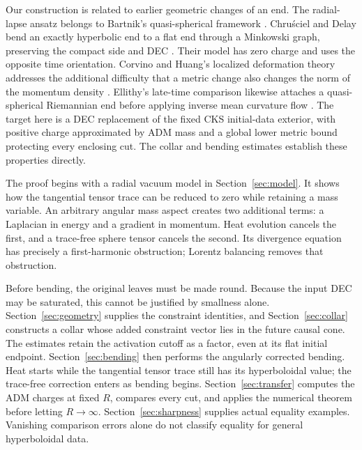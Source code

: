 Our construction is related to earlier geometric changes of an end.
The radial-lapse ansatz belongs to Bartnik's quasi-spherical framework
\cite{Bartnik}\cite[Section~5]{BartnikICM}.
Chru\'sciel and Delay bend an exactly hyperbolic end to a flat end
through a Minkowski graph, preserving the compact side and DEC
\cite[proof of Theorem~4.2]{ChruscielDelay}. Their model has zero charge
and uses the opposite time orientation. Corvino and Huang's localized
deformation theory addresses the additional difficulty that a metric
change also changes the norm of the momentum density
\cite[Introduction and Equation~(1.1)]{CorvinoHuang}.
Ellithy's late-time comparison likewise attaches a quasi-spherical
Riemannian end before applying inverse mean curvature flow
\cite[Appendix~C, proof of Theorem~C.1]{Ellithy}.
The target here is a DEC replacement of the fixed CKS initial-data
exterior, with positive charge approximated by ADM mass and a global
lower metric bound protecting every enclosing cut. The collar and
bending estimates establish these properties directly.

The proof begins with a radial vacuum model in
Section~\ref{sec:model}. It shows how the tangential tensor trace can
be reduced to zero while retaining a mass variable. An arbitrary angular
mass aspect creates two additional terms: a Laplacian in energy and a
gradient in momentum. Heat evolution cancels the first, and a trace-free
sphere tensor cancels the second. Its divergence equation has precisely
a first-harmonic obstruction; Lorentz balancing removes that obstruction.

Before bending, the original leaves must be made round. Because the
input DEC may be saturated, this cannot be justified by smallness alone.
Section~\ref{sec:geometry} supplies the constraint identities, and
Section~\ref{sec:collar} constructs a collar whose added constraint
vector lies in the future causal cone. The estimates retain the
activation cutoff as a factor, even at its flat initial endpoint.
Section~\ref{sec:bending} then performs the angularly corrected bending.
Heat starts while the tangential tensor trace still has its
hyperboloidal value; the trace-free correction enters as bending begins.
Section~\ref{sec:transfer} computes the ADM charges at fixed $R$,
compares every cut, and applies the numerical theorem before letting
$R\to\infty$. Section~\ref{sec:sharpness} supplies actual equality
examples. Vanishing comparison errors alone do not classify equality
for general hyperboloidal data.
